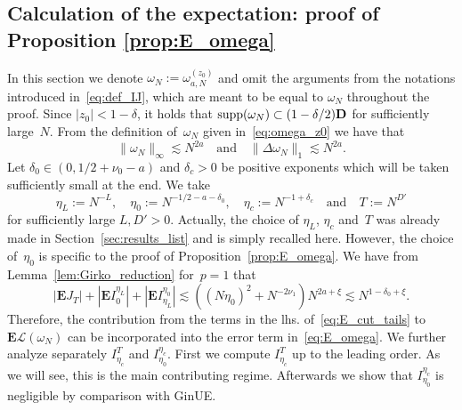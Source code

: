 \documentclass[10pt]{amsart}
\numberwithin{equation}{section}
\newcommand{\E}{\mathbf{E}}
\newcommand{\Lin}{\mathcal{L}}
\begin{document}
\subsection{Calculation of the expectation: proof of Proposition \ref{prop:E_omega}}\label{sec:E} In this section we denote $\omega_N:=\omega_{a,N}^{(z_0)}$ and omit the arguments from the notations introduced in~\eqref{eq:def_IJ}, which are meant to be equal to $\omega_N$ throughout the proof. Since $|z_0|<1-\delta$, it holds that ${\rm supp}(\omega_N)\subset (1-\delta/2)\mathbf{D}$ for sufficiently large~$N$. From the definition of~$\omega_N$ given in~\eqref{eq:omega_z0} we have that 
\begin{equation}
\|\omega_N\|_\infty\lesssim N^{2a}\quad\text{and}\quad \|\Delta\omega_N\|_1\lesssim N^{2a}.
\label{eq:omega_bounds}
\end{equation}
Let $\delta_0\in (0,1/2+\nu_0-a)$ and $\delta_c>0$ be positive exponents which will be taken sufficiently small at the end. We take 
\begin{equation}
\eta_L:=N^{-L},\quad \eta_0:=N^{-1/2-a-\delta_0},\quad \eta_c:=N^{-1+\delta_c}\quad\text{and}\quad T:=N^{D'}
\label{eq:E_eta_scales}
\end{equation}
for sufficiently large $L,D'>0$. Actually, the choice of $\eta_L$, $\eta_c$ and~$T$ was already made in Section~\ref{sec:results_list} and is simply recalled here. However, the choice of~$\eta_0$ is specific to the proof of Proposition~\ref{prop:E_omega}. We have from Lemma~\ref{lem:Girko_reduction} for~$p=1$ that 
\begin{equation}
|\E J_T| + |\E I_{0}^{\eta_L}|+|\E I_{\eta_L}^{\eta_0}|\lesssim ((N\eta_0)^2+N^{-2\nu_1})N^{2a+\xi}\lesssim N^{1-\delta_0+\xi}.
\label{eq:E_cut_tails}
\end{equation}
Therefore, the contribution from the terms in the lhs. of~\eqref{eq:E_cut_tails} to $\E\Lin(\omega_N)$ can be incorporated into the error term in~\eqref{eq:E_omega}. We further analyze separately $I_{\eta_c}^T$ and $I_{\eta_0}^{\eta_c}$. First we compute $I_{\eta_c}^T$ up to the leading order. As we will see, this is the main contributing regime. Afterwards we show that $I_{\eta_0}^{\eta_c}$ is negligible by comparison with GinUE.

\medskip
\end{document}
